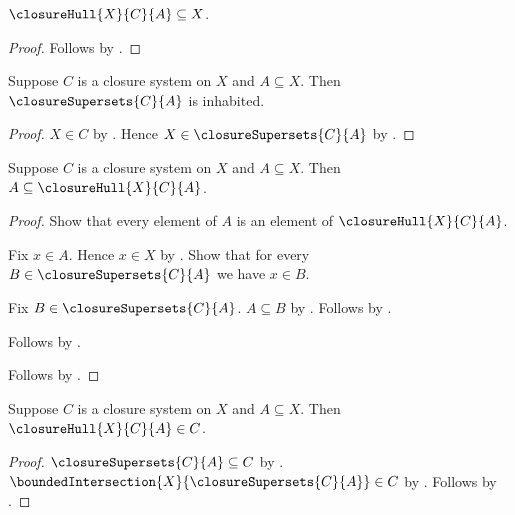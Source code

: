 \begin{proposition}\label{closure_hull_subseteq}
    $\closureHull{X}{C}{A}\subseteq X$.
\end{proposition}
\begin{proof}
    Follows by
        .
\end{proof}

\begin{proposition}\label{closure_supersets_inhabited}
    Suppose $C$ is a closure system on $X$ and $A\subseteq X$.
    Then $\closureSupersets{C}{A}$ is inhabited.
\end{proposition}
\begin{proof}
    $X\in C$ by .
    Hence $X\in\closureSupersets{C}{A}$ by
        .
\end{proof}

\begin{proposition}\label{closure_hull_extensive}
    Suppose $C$ is a closure system on $X$ and $A\subseteq X$.
    Then $A\subseteq\closureHull{X}{C}{A}$.
\end{proposition}
\begin{proof}
    Show that every element of $A$ is an element of
        $\closureHull{X}{C}{A}$.
    \begin{subproof}
        Fix $x\in A$.
        Hence $x\in X$ by .
        Show that for every $B\in\closureSupersets{C}{A}$ we have
            $x\in B$.
        \begin{subproof}
            Fix $B\in\closureSupersets{C}{A}$.
            $A\subseteq B$ by .
            Follows by .
        \end{subproof}
        Follows by
            .
    \end{subproof}
    Follows by .
\end{proof}

\begin{proposition}\label{closure_hull_closed}
    Suppose $C$ is a closure system on $X$ and $A\subseteq X$.
    Then $\closureHull{X}{C}{A}\in C$.
\end{proposition}
\begin{proof}
    $\closureSupersets{C}{A}\subseteq C$ by
        .
    $\boundedIntersection{X}{\closureSupersets{C}{A}}\in C$ by
        .
    Follows by .
\end{proof}


